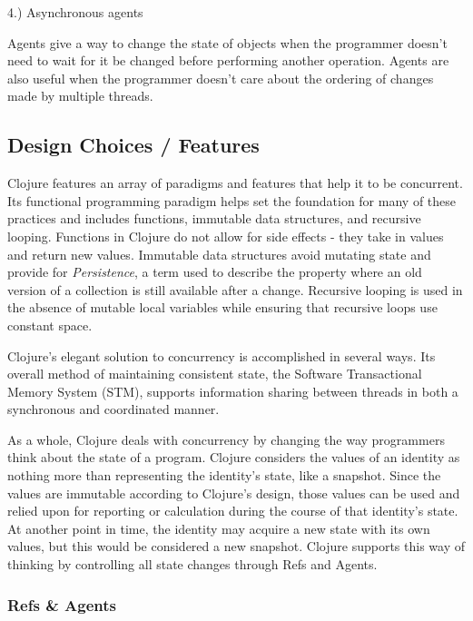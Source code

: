     4.) Asynchronous agents
    
        Agents give a way to change the state of objects when the programmer doesn't need to wait for it be changed before performing another operation. Agents are also useful when the programmer doesn't care about the ordering of changes made by multiple threads.            
    
    \cite{galpin_2010}

    
\subsection{Design Choices / Features}
    
   Clojure features an array of paradigms and features that help it to be concurrent. Its functional programming paradigm helps set the foundation for many of these practices and includes functions, immutable data structures, and recursive looping. Functions in Clojure do not allow for side effects - they take in values and return new values. Immutable data structures avoid mutating state and provide for \textit{Persistence}, a term used to describe the property where an old version of a collection is still available after a change. Recursive looping is used in the absence of mutable local variables while ensuring that recursive loops use constant space.
    
    Clojure's elegant solution to concurrency is accomplished in several ways. Its overall method of maintaining consistent state, the Software Transactional Memory System (STM), supports information sharing between threads in both  a synchronous and coordinated manner.
    
    As a whole, Clojure deals with concurrency by changing the way programmers think about the state of a program. Clojure considers the values of an identity as nothing more than representing the identity's state, like a snapshot. Since the values are immutable according to Clojure's design, those values can be used and relied upon for reporting or calculation during the course of that identity's state. At another point in time, the identity may acquire a new state with its own values, but this would be considered a new snapshot. Clojure supports this way of thinking by controlling all state changes through Refs and Agents.

\subsubsection{Refs \& Agents}

